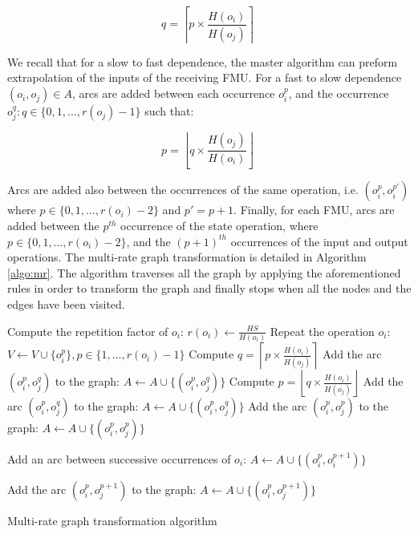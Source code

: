 \begin{equation}
q = \left \lceil{p \times \frac{H(o_i)}{H(o_j)}}\right \rceil\;
\end{equation}

We recall that for a slow to fast dependence, the master algorithm can preform extrapolation of the inputs of the receiving FMU. For a fast to slow dependence $(o_i,o_j) \in A$, arcs are added between each occurrence $o_i^p$, and the occurrence $o_j^q: q \in \{0,1, \dots ,r(o_j)-1\}$ such that:

\begin{equation}
p = \left \lfloor{q \times \frac{H(o_j)}{H(o_i)}}\right \rfloor\;
\end{equation}

Arcs are added also between the occurrences of the same operation, i.e. $(o_i^p,o_i^{p'})$ where $p \in \{0,1, \dots ,r(o_i)-2\}$ and $p' = p + 1$. Finally, for each FMU, arcs are added between the $p^{th}$ occurrence of the state operation, where $p \in \{0,1, \dots ,r(o_i)-2\}$, and the $(p+1)^{th}$ occurrences of the input and output operations. The multi-rate graph transformation is detailed in Algorithm \ref{algo:mr}. The algorithm traverses all the graph by applying the aforementioned rules in order to transform the graph and finally stops when all the nodes and the edges have been visited.

\begin{algorithm}[!htp]
		{
			Compute the repetition factor of $o_i$: $r(o_i) \leftarrow \frac{HS}{H(o_i)}$\;
			Repeat the operation $o_i$: $V \leftarrow V \cup \{o_i^p\}, p \in \{1, \dots,r(o_i)-1\}$\;
		}
		{
			{
					{
						Compute $q = \left \lceil{p \times \frac{H(o_i)}{H(o_j)}}\right \rceil$\;
						Add the arc $(o_i^p,o_j^q)$ to the graph: $A \leftarrow A \cup \{(o_i^p,o_j^q)\}$\;
					}
			}
			{
					{
						Compute $p = \left \lfloor{q \times \frac{H(o_i)}{H(o_j)}}\right \rfloor$\;
						Add the arc $(o_i^p,o_j^q)$ to the graph: $A \leftarrow A \cup \{(o_i^p,o_j^q)\}$\;
					}
			}
			\Else
			{
					{
					  Add the arc $(o_i^p,o_j^p)$ to the graph: $A \leftarrow A \cup \{(o_i^p,o_j^p)\}$\;
					}
			}
		}
		{
			{
				 Add an arc between successive occurrences of $o_i$: $A \leftarrow A \cup \{(o_i^p,o_i^{p+1})\}$\;
			}
			
		}
		{
					{
						{
							Add the arc $(o_i^p,o_j^{p+1})$ to the graph: $A \leftarrow A \cup \{(o_i^p,o_j^{p+1})\}$\;
						}
					
					}
		}
	\caption{Multi-rate graph transformation algorithm}
	\label{algo:mr}
\end{algorithm}

